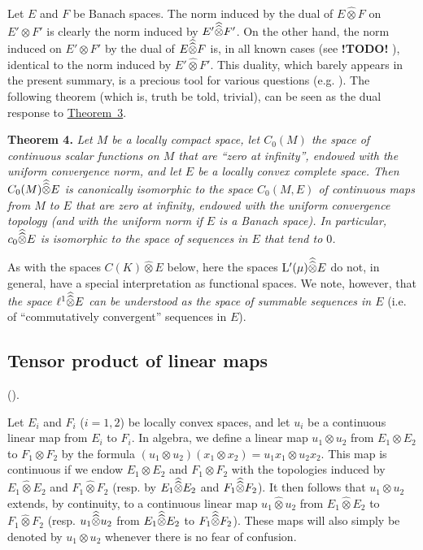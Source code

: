 \documentclass{article}
\theoremstyle{plain}
\newenvironment{itenv}[1]
  {\phantomsection\par\medskip\noindent\textbf{#1.}\itshape}
  {\medskip}
\newcommand{\LL}{\mathrm{L}}
\renewcommand{\ll}{\ell}
\newcommand{\hotimes}{\widehat{\otimes}}
\newcommand{\hhotimes}{\skew{0}{\widehat}{\skew{0}\widehat{\otimes}}}
\newcommand{\todo}{\textbf{ !TODO! }}
\newcommand{\oldpage}[1]{\marginpar{\footnotesize$\Big\vert$ \textit{p.~#1}}}
\begin{document}
Let $E$ and $F$ be Banach spaces.
The norm induced by the dual of $E\hotimes F$ on $E'\otimes F'$ is clearly the norm induced by $E'\hhotimes F'$.
On the other hand, the norm induced on $E'\otimes F'$ by the dual of $E\hhotimes F$ is, in all known cases (see \todo), identical to the norm induced by $E'\hotimes F'$.
This duality, which barely appears in the present summary, is a precious tool for various questions
\oldpage{83}
(e.g. \cite[chap.~I, \S4, n\textsuperscript{o}~6]{PTT}).
The following theorem (which is, truth be told, trivial), can be seen as the dual response to \hyperref[1.theorem3]{Theorem~3}.

\begin{itenv}{Theorem 4}
\label{1.theorem4}
  Let $M$ be a locally compact space, let $C_0(M)$ the space of continuous scalar functions on $M$ that are ``zero at infinity'', endowed with the uniform convergence norm, and let $E$ be a locally convex complete space.
  Then $C_0(M)\hhotimes E$ is canonically isomorphic to the space $C_0(M,E)$ of continuous maps from $M$ to $E$ that are zero at infinity, endowed with the uniform convergence topology (and with the uniform norm if $E$ is a Banach space).
  In particular, $c_0\hhotimes E$ is isomorphic to the space of sequences in $E$ that tend to $0$.
\end{itenv}

As with the spaces $C(K)\hotimes E$ below, here the spaces $\LL'(\mu)\hhotimes E$ do not, in general, have a special interpretation as functional spaces.
We note, however, that \emph{the space $\ll^1\hhotimes E$ can be understood as the space of summable sequences in $E$} (i.e. of ``commutatively convergent'' sequences in $E$).


\subsection{Tensor product of linear maps}
\label{1.6}

(\cite[chap.~1, \S1, n\textsuperscript{o}~2]{PTT}).
\medskip

Let $E_i$ and $F_i$ ($i=1,2$) be locally convex spaces, and let $u_i$ be a continuous linear map from $E_i$ to $F_i$.
In algebra, we define a linear map $u_1\otimes u_2$ from $E_1\otimes E_2$ to $F_1\otimes F_2$ by the formula $(u_1\otimes u_2)(x_1\otimes x_2)=u_1x_1\otimes u_2x_2$.
This map is continuous if we endow $E_1\otimes E_2$ and $F_1\otimes F_2$ with the topologies induced by $E_1\hotimes E_2$ and $F_1\hotimes F_2$ (resp. by $E_1\hhotimes E_2$ and $F_1\hhotimes F_2$).
It then follows that $u_1\otimes u_2$ extends, by continuity, to a continuous linear map $u_1\hotimes u_2$ from $E_1\hotimes E_2$ to $F_1\hotimes F_2$ (resp. $u_1\hhotimes u_2$ from $E_1\hhotimes E_2$ to $F_1\hhotimes F_2$).
These maps will also simply be denoted by $u_1\otimes u_2$ whenever there is no fear of confusion.
\end{document}
